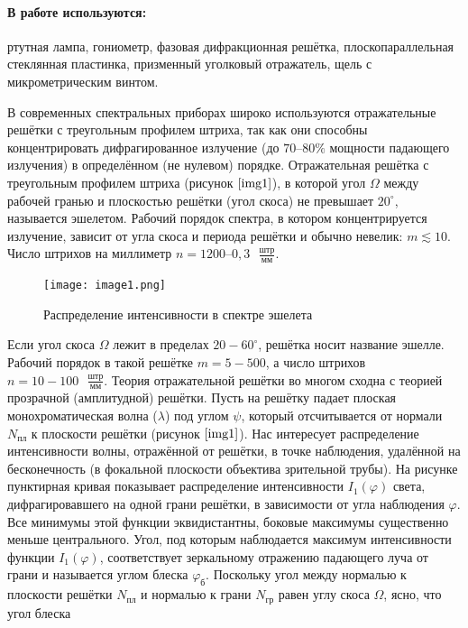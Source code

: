 \documentclass[a4paper,12pt]{article} %
\begin{document}
\paragraph{В работе используются: } ртутная лампа, гониометр, фазовая дифракционная решётка, плоскопараллельная стеклянная пластинка, призменный уголковый отражатель, щель с микрометрическим винтом.

В современных спектральных приборах широко используются отражательные решётки с треугольным профилем штриха, так как они способны концентрировать дифрагированное излучение (до $70–80 \%$ мощности падающего излучения) в определённом (не нулевом) порядке. Отражательная решётка с треугольным профилем штриха (рисунок $\ref{img1}$), в которой угол $\Omega$ между рабочей гранью и плоскостью решётки (угол скоса) не превышает $20^\circ$, называется эшелетом. Рабочий порядок спектра, в котором концентрируется излучение, зависит от угла скоса и периода решётки и обычно невелик: $m\lesssim10$. Число штрихов на миллиметр $n=1200 – 0,3\text{ }\frac{\text{штр}}{\text{мм}}$.

\begin{figure}[h]
    \begin{center}
        \texttt{[image: image1.png]}
    \end{center}
    \caption{Распределение интенсивности в спектре эшелета}
    \label{img1}
\end{figure}

Если угол скоса $\Omega$ лежит в пределах $20 - 60^\circ$, решётка носит название эшелле. Рабочий порядок в такой решётке $m=5 - 500$, а число штрихов $n=10-100\text{ }\frac{\text{штр}}{\text{мм}}$. Теория отражательной решётки во многом сходна с теорией прозрачной (амплитудной) решётки. Пусть на решётку падает плоская монохроматическая волна ($\lambda$) под углом $\psi$, который отсчитывается от нормали $N_{\text{пл}}$ к плоскости решётки (рисунок $\ref{img1}$). Нас интересует распределение интенсивности волны, отражённой от решётки, в точке наблюдения, удалённой на бесконечность (в фокальной плоскости объектива зрительной трубы). На рисунке пунктирная кривая показывает распределение интенсивности $I_1(\varphi)$ света, дифрагировавшего на одной грани решётки, в зависимости от угла наблюдения $\varphi$. Все минимумы этой функции эквидистантны, боковые максимумы существенно меньше центрального. Угол, под которым наблюдается максимум интенсивности функции $I_1(\varphi)$, соответствует зеркальному отражению падающего луча от грани и называется углом блеска $\varphi_{\text{б}}$. Поскольку угол между нормалью к плоскости решётки $N_{\text{пл}}$ и нормалью к грани $N_{\text{гр}}$ равен углу скоса
$\Omega$, ясно, что угол блеска
\end{document}
